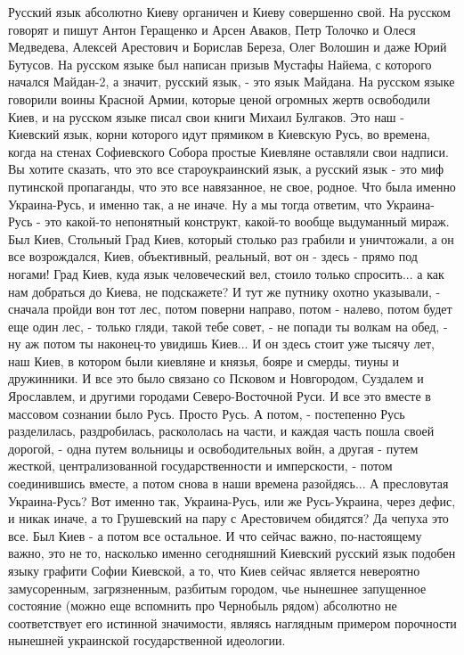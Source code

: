 Русский язык абсолютно Киеву органичен и Киеву совершенно свой. На русском
говорят и пишут Антон Геращенко и Арсен Аваков, Петр Толочко и Олеся Медведева,
Алексей Арестович и Борислав Береза, Олег Волошин и даже Юрий Бутусов. На
русском языке был написан призыв Мустафы Найема, с которого начался Майдан-2, а
значит, русский язык, - это язык Майдана.  На русском языке говорили воины
Красной Армии, которые ценой огромных жертв освободили Киев, и на русском языке
писал свои книги Михаил Булгаков. Это наш - Киевский язык, корни которого идут
прямиком в Киевскую Русь, во времена, когда на стенах Софиевского Собора
простые Киевляне оставляли свои надписи. Вы хотите сказать, что это все
староукраинский язык, а русский язык - это миф путинской пропаганды, что это
все навязанное, не свое, родное. Что была именно Украина-Русь, и именно так, а
не иначе.  Ну а мы тогда ответим, что Украина-Русь - это какой-то непонятный
конструкт, какой-то вообще выдуманный мираж. Был Киев, Стольный Град Киев,
который столько раз грабили и уничтожали, а он все возрождался, Киев,
объективный, реальный, вот он - здесь - прямо под ногами! Град Киев, куда язык
человеческий вел, стоило только спросить...  а как нам добраться до Киева, не
подскажете? И тут же путнику охотно указывали, - сначала пройди вон тот лес,
потом поверни направо, потом - налево, потом будет еще один лес, - только
гляди, такой тебе совет, - не попади ты волкам на обед, - ну аж потом ты
наконец-то увидишь Киев...  И он здесь стоит уже тысячу лет, наш Киев, в
котором были киевляне и князья, бояре и смерды, тиуны и дружинники. И все это
было связано со Псковом и Новгородом, Суздалем и Ярославлем, и другими городами
Северо-Восточной Руси.  И все это вместе в массовом сознании было Русь. Просто
Русь. А потом, - постепенно Русь разделилась, раздробилась, раскололась на
части, и каждая часть пошла своей дорогой, - одна путем вольницы и
освободительных войн, а другая - путем жесткой, централизованной
государственности и имперскости, - потом соединившись вместе, а потом снова в
наши времена разойдясь... А пресловутая Украина-Русь?  Вот именно так,
Украина-Русь, или же Русь-Украина, через дефис, и никак иначе, а то Грушевский
на пару с Арестовичем обидятся?  Да чепуха это все. Был Киев - а потом все
остальное. И что сейчас важно, по-настоящему важно, это не то, насколько именно
сегодняшний Киевский русский язык подобен языку графити Софии Киевской, а то,
что Киев сейчас является невероятно замусоренным, загрязненным, разбитым
городом, чье нынешнее запущенное состояние (можно еще вспомнить про Чернобыль
рядом) абсолютно не соответствует его истинной значимости, являясь наглядным
примером порочности нынешней украинской государственной идеологии.

